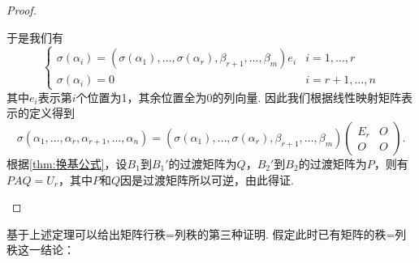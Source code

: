 \begin{proof}
\begin{enumerate}
        于是我们有
        \[\begin{cases}
                \sigma(\alpha_i)=(\sigma(\alpha_1),\ldots,\sigma(\alpha_r),\beta_{r+1},\ldots,\beta_m)e_i & i=1,\ldots,r   \\
                \sigma(\alpha_i)=0                                                                        & i=r+1,\ldots,n
            \end{cases}\]
        其中$e_i$表示第$i$个位置为1，其余位置全为0的列向量. 因此我们根据线性映射矩阵表示的定义得到
        \[\sigma(\alpha_1,\ldots,\alpha_r,\alpha_{r+1},\ldots,\alpha_n)=(\sigma(\alpha_1),\ldots,\sigma(\alpha_r),\beta_{r+1},\ldots,\beta_m)\begin{pmatrix}
                E_r & O \\ O & O
            \end{pmatrix}.\]
        根据\autoref{thm:换基公式}，设$B_1$到$B_1'$的过渡矩阵为$Q$，$B_2'$到$B_2$的过渡矩阵为$P$，则有$PAQ=U_r$，其中$P$和$Q$因是过渡矩阵所以可逆，由此得证.
    \end{enumerate}
\end{proof}


基于上述定理可以给出矩阵行秩=列秩的第三种证明. 假定此时已有矩阵的秩=列秩这一结论：

